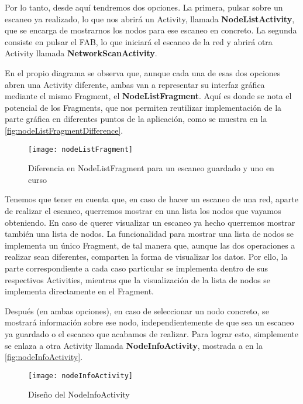 Por lo tanto, desde aquí tendremos dos opciones. La primera, pulsar sobre un escaneo ya realizado, lo que nos abrirá un Activity, llamada \textbf{NodeListActivity}, que se encarga de mostrarnos los nodos para ese escaneo en concreto. La segunda consiste en pulsar el FAB, lo que iniciará el escaneo de la red y abrirá otra Activity llamada \textbf{NetworkScanActivity}.

En el propio diagrama se observa que, aunque cada una de esas dos opciones abren una Activity diferente, ambas van a representar su interfaz gráfica mediante el mismo Fragment, el \textbf{NodeListFragment}. Aquí es donde se nota el potencial de los Fragments, que nos permiten reutilizar implementación de la parte gráfica en diferentes puntos de la aplicación, como se muestra en la \autoref{fig:nodeListFragmentDifference}.

\begin{figure}[H]
	\centering
	\texttt{[image: nodeListFragment]}
	\caption{Diferencia en NodeListFragment para un escaneo guardado y uno en curso}
	\label{fig:nodeListFragmentDifference}
\end{figure}

Tenemos que tener en cuenta que, en caso de hacer un escaneo de una red, aparte de realizar el escaneo, querremos mostrar en una lista los nodos que vayamos obteniendo. En caso de querer visualizar un escaneo ya hecho querremos mostrar también una lista de nodos. La funcionalidad para mostrar una lista de nodos se implementa un único Fragment, de tal manera que, aunque las dos operaciones a realizar sean diferentes, comparten la forma de visualizar los datos. Por ello, la parte correspondiente a cada caso particular se implementa dentro de sus respectivos Activities, mientras que la visualización de la lista de nodos se implementa directamente en el Fragment.

Después (en ambas opciones), en caso de seleccionar un nodo concreto, se mostrará información sobre ese nodo, independientemente de que sea un escaneo ya guardado o el escaneo que acabamos de realizar. Para lograr esto, simplemente se enlaza a otra Activity llamada \textbf{NodeInfoActivity}, mostrada a en la \autoref{fig:nodeInfoActivity}.

\begin{figure}[H]
	\centering
	\texttt{[image: nodeInfoActivity]}
	\caption{Diseño del NodeInfoActivity}
	\label{fig:nodeInfoActivity}
\end{figure}

